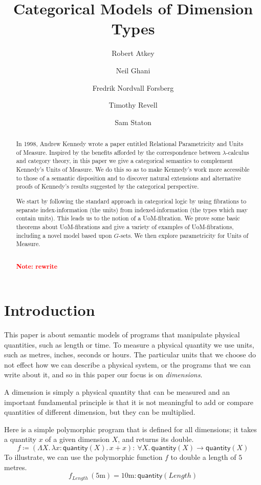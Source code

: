 \documentclass[a4paper,UKenglish]{lipics}
\title{Categorical Models of Dimension Types}
\author[1]{Robert Atkey}
\author[2]{Neil Ghani}
\author[2]{Fredrik Nordvall Forsberg}
\author[2]{Timothy Revell}
\author[3]{Sam Staton}
\affil[1]{University of Edinburgh}
\affil[2]{University of Strathclyde}
\affil[3]{University of Cambridge}
\newcommand\note[1]{{ \bf \textcolor{red} {\vspace{2mm}\; \\ Note: #1\\}}}
\newcommand{\UoM}{Units of Measure\xspace}
\newcommand{\msf}[1]{\mathsf{#1}} %
\newcommand{\qnt}{\msf{quantity}}
\newcommand{\lengthDim}{\mathit{Length}}
\newcommand{\UoMFibrations}{UoM-fibrations\xspace}
\begin{document}
\maketitle

\begin{abstract}

  In 1998, Andrew Kennedy wrote a paper entitled Relational Parametricity and \UoM\cite{Kennedy:1997:RPU:263699.263761}. Inspired by the benefits afforded by the correspondence between $\lambda$-calculus and category theory, in this paper we give a categorical semantics to complement Kennedy's \UoM. We do this so as to make Kennedy's work more accessible to those of a semantic disposition and to discover natural extensions and alternative proofs of Kennedy's results suggested by the categorical perspective.

  We start by following the standard approach in categorical logic by using fibrations to separate index-information (the units) from indexed-information (the types which may contain units). This leads us to the notion of a UoM-fibration. We prove some basic theorems about UoM-fibrations and give a variety of examples of \UoMFibrations, including a novel model based upon $G$-sets. We then explore parametricity for \UoM.

  \note{rewrite}
\end{abstract}

\section{Introduction}
This paper is about semantic models of programs that manipulate physical quantities, such as length or time. To measure a physical quantity we use units, such as metres, inches, seconds or hours. The particular units that we choose do not effect how we can describe a physical system, or the programs that we can write about it, and so in this paper our focus is on \emph{dimensions}.

A dimension is simply a physical quantity that can be measured and an important fundamental principle is that it is not meaningful to add or compare quantities of different dimension, but they can be multiplied.

Here is a simple polymorphic program that is defined for all dimensions; it takes a quantity $x$ of a given dimension $X$, and returns its double.
\begin{equation}
f\coloneqq (\Lambda X.\,\lambda x:\qnt(X).\,x+x)
:\ \forall X.\,\qnt(X)\to \qnt(X)
\label{eqn:double}
\end{equation}
To illustrate, we can use the polymorphic function $f$ to double a length of $5$ metres.
\begin{equation}
f_\lengthDim\,(5\mathrm{m})=
10\mathrm{m}:\qnt(\lengthDim)
\label{eqn:doubleapp}
\end{equation}
\end{document}
